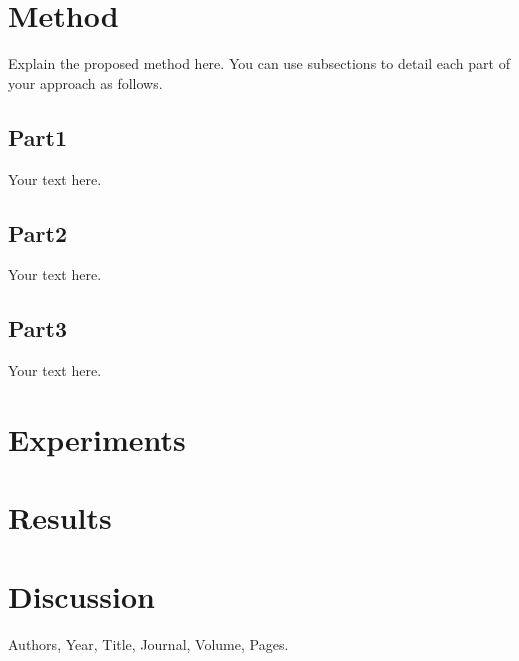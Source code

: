\documentclass{article}
\begin{document}
\section{Method}\label{sec:method}
Explain the proposed method here.
You can use subsections to detail each part of your approach as follows. 
\subsection{Part1}
Your text here.

\subsection{Part2}
Your text here.

\subsection{Part3}
Your text here.

\section{Experiments}\label{sec:experiments}


\section{Results}\label{sec:results}


\section{Discussion}\label{sec:discussion}







\begin{thebibliography}{}

Authors, Year, Title, Journal, Volume, Pages.

\end{thebibliography}
\end{document}

